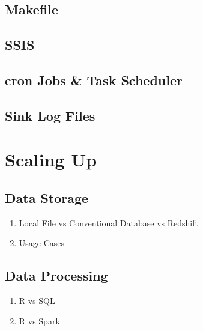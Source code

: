 \documentclass[
]{book}
\providecommand{\tightlist}{%
  \setlength{\itemsep}{0pt}\setlength{\parskip}{0pt}}
\begin{document}
\hypertarget{makefile}{%
\section{Makefile}\label{makefile}}

\hypertarget{ssis}{%
\section{SSIS}\label{ssis}}

\hypertarget{cron-jobs-task-scheduler}{%
\section{cron Jobs \& Task Scheduler}\label{cron-jobs-task-scheduler}}

\hypertarget{sink-log-files}{%
\section{Sink Log Files}\label{sink-log-files}}

\hypertarget{scaling-up}{%
\chapter{Scaling Up}\label{scaling-up}}

\hypertarget{data-storage}{%
\section{Data Storage}\label{data-storage}}

\begin{enumerate}
\def\labelenumi{\arabic{enumi}.}
\tightlist
\item
  Local File vs Conventional Database vs Redshift
\item
  Usage Cases
\end{enumerate}

\hypertarget{data-processing}{%
\section{Data Processing}\label{data-processing}}

\begin{enumerate}
\def\labelenumi{\arabic{enumi}.}
\tightlist
\item
  R vs SQL
\item
  R vs Spark
\end{enumerate}
\end{document}
